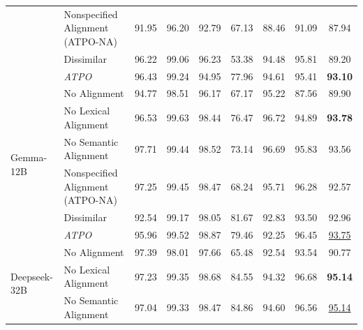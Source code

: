 \begin{table}[t!]
{\begin{tabular}{|l|l|ccccccc|}
                             &  Nonspecified Alignment (ATPO-NA)  &   91.95  &   96.20  &   92.79  &   67.13  &   88.46  &   91.09  &   \multicolumn{1}{|c|}{87.94}  \\
                             &  Dissimilar  &   96.22  &   99.06  &   96.23  &   53.38  &   94.48  &   95.81  &  \multicolumn{1}{|c|}{89.20}  \\  
                            &   \textit{ATPO}  &   96.43  &  99.24  &   94.95  &  77.96  &  94.61  &   95.41  &  \multicolumn{1}{|c|}{ \textbf{93.10}}  \\  \hline
\multirow{6}{*}{Gemma-12B}   %
                             &  No Alignment &  94.77   &  98.51   &  96.17   &  67.17   &  95.22   &   87.56  &   \multicolumn{1}{|c|}{89.90}  \\  
                             &  No Lexical Alignment       &   96.53  &   99.63  &   98.44  &   76.47  &   96.72  &   94.89  &   \multicolumn{1}{|c|}{\textbf{93.78}}  \\ 
                             &  No Semantic Alignment    &   97.71  &   99.44  &   98.52  &   73.14  &   96.69  &   95.83  &   \multicolumn{1}{|c|}{93.56}  \\
                             &  Nonspecified Alignment (ATPO-NA)  &   97.25  &   99.45  &   98.47  &   68.24  &   95.71  &   96.28  &   \multicolumn{1}{|c|}{92.57}  \\ 
                             &  Dissimilar  &   92.54  &   99.17  &   98.05  &   81.67  &   92.83  &   93.50  &  \multicolumn{1}{|c|}{92.96}  \\  
                            &   \textit{ATPO}  &   95.96  &  99.52  &   98.87  &  79.46  &  92.25  &   96.45  &  \multicolumn{1}{|c|}{\underline{93.75}}  \\  \hline
\multirow{6}{*}{Deepseek-32B}    
                             &  No Alignment &  97.39   &  98.01   &  97.66   &  65.48   &  92.54   &  93.54   &   \multicolumn{1}{|c|}{90.77}  \\
                             &  No Lexical Alignment   &   97.23  &   99.35  &   98.68  &   84.55  &   94.32  &   96.68  &   \multicolumn{1}{|c|}{\textbf{95.14}}  \\ 
                             &  No Semantic Alignment    &   97.04  &   99.33  &   98.47  &   84.86  &   94.60  &   96.56  &   \multicolumn{1}{|c|}{\underline{95.14}}  \\

\end{tabular}}
\end{table}

